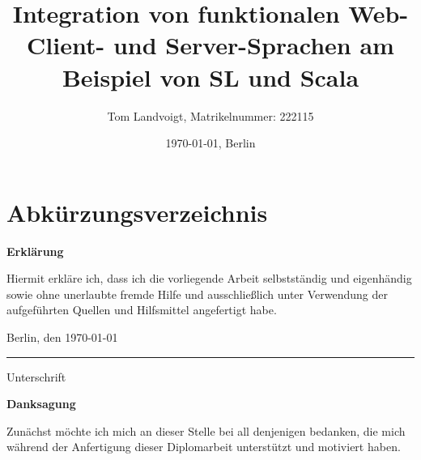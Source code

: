 \documentclass[12pt,bibtotoc]{scrreprt}
\title{Integration von funktionalen Web-Client- und Server-Sprachen am Beispiel von SL und Scala}
\author{Tom Landvoigt, Matrikelnummer: 222115}
\date{\today{}, Berlin}
\begin{document}
\maketitle
\tableofcontents   %
\listoffigures     %
\listoftables      %
\lstlistoflistings %

\chapter*{Abkürzungsverzeichnis}
\begin{acronym}[TU-Berlin]
\setlength{\itemsep}{-0.3\parsep}
 
 \acro{}{}
\end{acronym}


\newpage
\thispagestyle{empty}		%
\begin{LARGE}
	\textbf{Erklärung}
\end{LARGE}

\vspace{1cm}

Hiermit erkläre ich, dass ich die vorliegende Arbeit selbstständig und eigenhändig sowie ohne unerlaubte fremde Hilfe und ausschließlich unter Verwendung der aufgeführten Quellen und Hilfsmittel angefertigt habe.
\vspace{2cm}

Berlin, den \today

\vspace{1cm}

\rule{0.3\textwidth}{0.4pt}

Unterschrift

\vspace*{6cm}

\begin{LARGE}
    \textbf{Danksagung}		%
\end{LARGE}

\vspace{1cm}

Zunächst möchte ich mich an dieser Stelle bei all denjenigen bedanken, die mich während der Anfertigung dieser Diplomarbeit unterstützt und motiviert haben.
\end{document}
